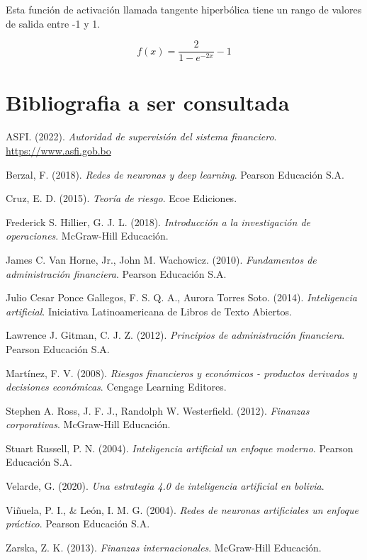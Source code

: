 \documentclass[
  12pt,
]{article}
\newlength{\cslhangindent}
\newlength{\cslentryspacingunit} %
\newenvironment{CSLReferences}[2] %
 {%
  \setlength{\parindent}{0pt}
  \ifodd #1
  \let\oldpar\par
  \def\par{\hangindent=\cslhangindent\oldpar}
  \fi
  \setlength{\parskip}{#2\cslentryspacingunit}
 }%
 {}
\begin{document}
Esta función de activación llamada tangente hiperbólica tiene un rango
de valores de salida entre -1 y 1.

\[ f(x) = \frac{2}{1-e^{-2x}} - 1 \]

\newpage

\hypertarget{bibliografia-a-ser-consultada}{%
\section{Bibliografia a ser
consultada}\label{bibliografia-a-ser-consultada}}

\hypertarget{refs}{}
\begin{CSLReferences}{1}{0}
\leavevmode{}%
ASFI. (2022). \emph{Autoridad de supervisión del sistema financiero}.
\url{https://www.asfi.gob.bo}

\leavevmode{}%
Berzal, F. (2018). \emph{Redes de neuronas y deep learning}. Pearson
Educación S.A.

\leavevmode{}%
Cruz, E. D. (2015). \emph{Teoría de riesgo}. Ecoe Ediciones.

\leavevmode{}%
Frederick S. Hillier, G. J. L. (2018). \emph{Introducción a la
investigación de operaciones}. McGraw-Hill Educación.

\leavevmode{}%
James C. Van Horne, Jr., John M. Wachowicz. (2010). \emph{Fundamentos de
administración financiera}. Pearson Educación S.A.

\leavevmode{}%
Julio Cesar Ponce Gallegos, F. S. Q. A., Aurora Torres Soto. (2014).
\emph{Inteligencia artificial}. Iniciativa Latinoamericana de Libros de
Texto Abiertos.

\leavevmode{}%
Lawrence J. Gitman, C. J. Z. (2012). \emph{Principios de administración
financiera}. Pearson Educación S.A.

\leavevmode{}%
Martínez, F. V. (2008). \emph{Riesgos financieros y económicos -
productos derivados y decisiones económicas}. Cengage Learning Editores.

\leavevmode{}%
Stephen A. Ross, J. F. J., Randolph W. Westerfield. (2012).
\emph{Finanzas corporativas}. McGraw-Hill Educación.

\leavevmode{}%
Stuart Russell, P. N. (2004). \emph{Inteligencia artificial un enfoque
moderno}. Pearson Educación S.A.

\leavevmode{}%
Velarde, G. (2020). \emph{Una estrategia 4.0 de inteligencia artificial
en bolivia}.

\leavevmode{}%
Viñuela, P. I., \& León, I. M. G. (2004). \emph{Redes de neuronas
artificiales un enfoque práctico}. Pearson Educación S.A.

\leavevmode{}%
Zarska, Z. K. (2013). \emph{Finanzas internacionales}. McGraw-Hill
Educación.

\end{CSLReferences}
\end{document}
